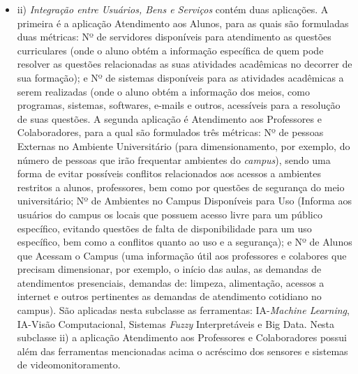 \documentclass[portuguese]{textolivre}
\begin{document}
\begin{itemize}
\item ii) \textit{Integração entre Usuários, Bens e Serviços} contém duas aplicações. A primeira é a aplicação Atendimento aos Alunos, para as quais são formuladas duas métricas: Nº de servidores disponíveis para atendimento as questões curriculares (onde o aluno obtém a informação específica de quem pode resolver as questões relacionadas as suas atividades acadêmicas no decorrer de sua formação); e Nº de sistemas disponíveis para as atividades acadêmicas a serem realizadas (onde o aluno obtém a informação dos meios, como programas, sistemas, softwares, e-mails e outros, acessíveis para a resolução de suas questões. A segunda aplicação é Atendimento aos Professores e Colaboradores, para a qual são formulados três métricas: Nº de pessoas Externas no Ambiente Universitário (para dimensionamento, por exemplo, do número de pessoas que irão frequentar ambientes do \textit{campus}), sendo uma forma de evitar possíveis conflitos relacionados aos acessos a ambientes restritos a alunos, professores, bem como por questões de segurança do meio universitário; Nº de Ambientes no Campus Disponíveis para Uso (Informa aos usuários do campus os locais que possuem acesso livre para um público específico, evitando questões de falta de disponibilidade para um uso específico, bem como a conflitos quanto ao uso e a segurança); e Nº de Alunos que Acessam o Campus (uma informação útil aos professores e colabores que precisam dimensionar, por exemplo, o início das aulas, as demandas de atendimentos presenciais, demandas de: limpeza, alimentação, acessos a internet e outros pertinentes as demandas de atendimento cotidiano no campus). São aplicadas nesta subclasse as ferramentas: IA-\textit{Machine Learning}, IA-Visão Computacional, Sistemas \textit{Fuzzy} Interpretáveis e Big Data. Nesta subclasse ii) a aplicação Atendimento aos Professores e Colaboradores possui além das ferramentas mencionadas acima o acréscimo dos sensores e sistemas de videomonitoramento.
\end{itemize}
\medskip
\end{document}
